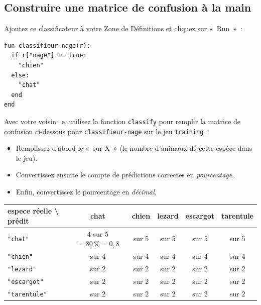 \documentclass[12pt,a4paper]{article}
\begin{document}
\subsection{Construire une matrice de confusion à la main}

\begin{activitybox}
  Ajoutez ce classificateur à votre Zone de Définitions et cliquez sur «~Run~»~:
  \begin{lstlisting}
fun classifieur-nage(r):
  if r["nage"] == true:
    "chien"
  else:
    "chat"
  end
end
  \end{lstlisting}

  Avec votre voisin·e, utilisez la fonction \texttt{classify} pour remplir la matrice de confusion ci-dessous pour \texttt{classifieur-nage} sur le jeu \texttt{training}~:

  \vspace{0.5em}
  \begin{itemize}
    \item Remplissez d'abord le «~sur X~» (le nombre d'animaux de cette espèce dans le jeu).
    \item Convertissez ensuite le compte de prédictions correctes en \emph{pourcentage}.
    \item Enfin, convertissez le pourcentage en \emph{décimal}.
  \end{itemize}

  \vspace{0.5em}
  \begin{center}
  \small
  \begin{tabular}{l|c|c|c|c|c}
    \toprule
    \textbf{espece réelle} \textbackslash{} \textbf{prédit} & chat & chien & lezard & escargot & tarentule \\
    \midrule
    \texttt{"chat"}      & 4 sur 5 $= 80\,\% = 0{,}8$ & sur 5 & sur 5 & sur 5 & sur 5 \\
    \texttt{"chien"}     & sur 4 & sur 4 & sur 4 & sur 4 & sur 4 \\
    \texttt{"lezard"}    & sur 2 & sur 2 & sur 2 & sur 2 & sur 2 \\
    \texttt{"escargot"}  & sur 2 & sur 2 & sur 2 & sur 2 & sur 2 \\
    \texttt{"tarentule"} & sur 2 & sur 2 & sur 2 & sur 2 & sur 2 \\
    \bottomrule
  \end{tabular}
  \end{center}
\end{activitybox}
\end{document}
